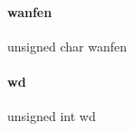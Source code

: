\paragraph{wanfen}
{\footnotesize\ttfamily unsigned char wanfen}

\mbox{\label{a00047_a083a2d27d21ee31bc447f1d4260b94ba}} 
\paragraph{wd}
{\footnotesize\ttfamily unsigned int wd}

